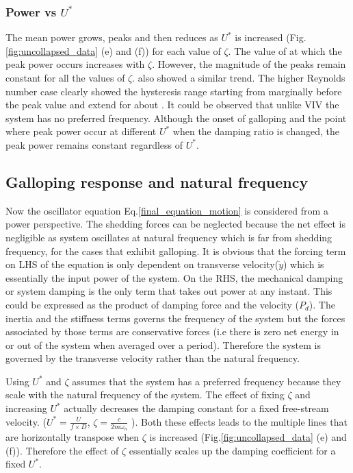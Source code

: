  
 \subsubsection*{Power vs $U^*$}
 
 The mean power grows, peaks and then reduces as $U^*$ is increased (Fig.\ref{fig:uncollapsed_data} (e) and (f)) for each value of $\zeta$. The value of \ustar at which the peak power occurs increases with $\zeta$. However, the magnitude of the peaks remain constant for all the values of $\zeta$.  \cite{Barrero-Gil2010a} also showed a similar trend. The higher Reynolds number case clearly showed the hysteresis range starting from marginally before the peak value and extend for about . It could be observed that unlike VIV the  system has no preferred frequency. Although the onset of galloping and the point where peak power occur at different $U^*$ when the damping ratio is changed, the peak power remains constant regardless of $U^*$.
 
 \subsection{Galloping response and natural frequency}
 
 Now the oscillator equation Eq.\eqref{final_equation_motion} is considered from a power perspective. The shedding forces can be neglected because the net effect is negligible as system oscillates at natural frequency which is far from shedding frequency, for the cases that exhibit galloping. It is obvious that the forcing term on LHS of the equation is only dependent on transverse velocity($\dot{y}$) which is essentially the input power of the system. On the RHS, the mechanical damping or system damping is the only term that takes out power at any instant. This could be expressed as the product of damping force and the velocity ($P_d$). The inertia and the stiffness terms governs the frequency of the system but the forces associated by those terms are conservative forces (i.e there is zero net energy in or out of the system when averaged over a period). Therefore the system is governed by the transverse velocity rather than the natural frequency.
 

 Using $U^*$ and $\zeta$ assumes that the system has a preferred frequency because they scale with the natural frequency of the system. The effect of fixing $\zeta$ and increasing $U^*$ actually decreases the damping constant for a fixed free-stream velocity. ($U^*=\frac{U}{f \times D}$, $\zeta= \frac{c}{2 m \omega_n}$ ). Both these effects leads to the multiple lines that are horizontally transpose when $\zeta$ is increased (Fig.\ref{fig:uncollapsed_data} (e) and (f)). Therefore the effect of $\zeta$ essentially scales up the damping coefficient for a fixed $U^*$.
 

